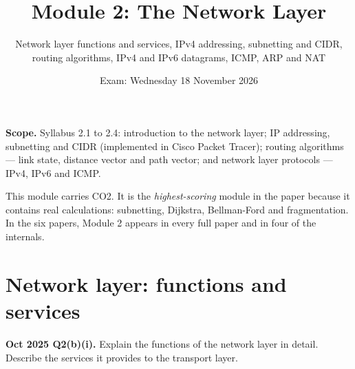 \documentclass[11pt,a4paper]{article}
\title{\textbf{Module 2: The Network Layer}\\}
\author{\large Network layer functions and services, IPv4 addressing, subnetting and CIDR,\\
routing algorithms, IPv4 and IPv6 datagrams, ICMP, ARP and NAT}
\date{Exam: Wednesday 18 November 2026}
\begin{document}
\maketitle

\begin{exambox}
\textbf{Scope.} Syllabus 2.1 to 2.4: introduction to the network layer; IP addressing, subnetting and CIDR (implemented in Cisco Packet Tracer); routing algorithms --- link state, distance vector and path vector; and network layer protocols --- IPv4, IPv6 and ICMP.

This module carries CO2. It is the \emph{highest-scoring} module in the paper because it contains real calculations: subnetting, Dijkstra, Bellman-Ford and fragmentation. In the six papers, Module 2 appears in every full paper and in four of the internals.
\end{exambox}

\tableofcontents
\newpage

\section{Network layer: functions and services}

\begin{pyqbox}
\textbf{Oct 2025 Q2(b)(i).} Explain the functions of the network layer in detail. Describe the services it provides to the transport layer.
\end{pyqbox}
\end{document}
